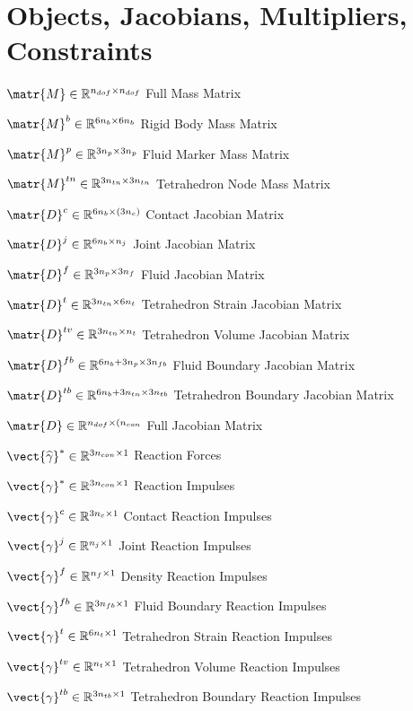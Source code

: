 \section*{Objects, Jacobians, Multipliers, Constraints}
\begin{compactdesc}
    \item[$\matr{M} \in \mathbb{R}^{n_{dof} \times n_{dof}}$] Full Mass Matrix
    \item[$\matr{M}^{b} \in \mathbb{R}^{6n_{b} \times 6n_{b}}$] Rigid Body Mass Matrix
    \item[$\matr{M}^{p} \in \mathbb{R}^{3n_{p} \times 3n_{p}}$] Fluid Marker Mass Matrix
    \item[$\matr{M}^{tn} \in \mathbb{R}^{3n_{tn} \times 3n_{tn}}$] Tetrahedron Node Mass Matrix
    \item[$\matr{D}^{c} \in \mathbb{R}^{6n_{b} \times (3n_{c})}$] Contact Jacobian Matrix
    \item[$\matr{D}^{j} \in \mathbb{R}^{6n_{b} \times n_{j}}$] Joint Jacobian Matrix
    \item[$\matr{D}^{f} \in \mathbb{R}^{3n_{p} \times 3n_{f}}$] Fluid Jacobian Matrix
    \item[$\matr{D}^{t} \in \mathbb{R}^{3n_{tn} \times 6n_{t}}$] Tetrahedron Strain Jacobian Matrix
    \item[$\matr{D}^{tv} \in \mathbb{R}^{3n_{tn} \times n_{t}}$] Tetrahedron Volume Jacobian Matrix
    \item[$\matr{D}^{fb} \in \mathbb{R}^{6n_{b} + 3n_{p}\times 3n_{fb}}$] Fluid Boundary Jacobian Matrix
    \item[$\matr{D}^{tb} \in \mathbb{R}^{6n_{b} + 3n_{tn} \times 3n_{tb}}$] Tetrahedron Boundary Jacobian Matrix
    \item[$\matr{D} \in \mathbb{R}^{n_{dof} \times (n_{con}}$] Full Jacobian Matrix
    \item[$\vect{\widehat{\gamma}}^{*}\in \mathbb{R}^{3n_{con} \times 1}$] Reaction Forces
    \item[$\vect{\gamma}^{*}\in \mathbb{R}^{3n_{con} \times 1}$]  Reaction Impulses
    \item[$\vect{\gamma}^{c}\in \mathbb{R}^{3n_{c} \times 1}$] Contact Reaction Impulses
    \item[$\vect{\gamma}^{j}\in \mathbb{R}^{n_{j} \times 1}$] Joint Reaction Impulses
    \item[$\vect{\gamma}^{f}\in \mathbb{R}^{n_{f} \times 1}$] Density Reaction Impulses
    \item[$\vect{\gamma}^{fb}\in \mathbb{R}^{3n_{fb} \times 1}$] Fluid Boundary Reaction Impulses
    \item[$\vect{\gamma}^{t}\in \mathbb{R}^{6n_{t} \times 1}$] Tetrahedron Strain Reaction Impulses
    \item[$\vect{\gamma}^{tv}\in \mathbb{R}^{n_{t} \times 1}$] Tetrahedron Volume Reaction Impulses
    \item[$\vect{\gamma}^{tb}\in \mathbb{R}^{3n_{tb} \times 1}$] Tetrahedron Boundary Reaction Impulses
\end{compactdesc}

